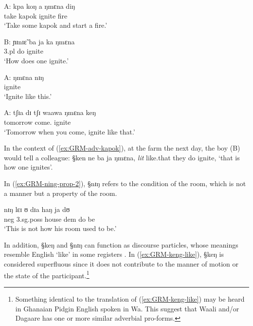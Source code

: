 \begin{exe}
\ex\label{ex:GRM-adv-kapok}
 \begin{xlist}
 
 \ex\label{ex:GRM-adv-kapok-A-1}
\gll A: kpa koŋ a ŋmɛna diŋ\\
{}  take kapok {\conn} ignite fire\\
\glt `Take some kapok and start a fire.'

 \ex\label{ex:GRM-adv-kapok-B}
\gll B:  ɲɪnɪɛ̃ ba ja ka ŋmɛna\\
{} {\q} {\sc 3.pl} do {\egr} ignite\\
\glt `How does one ignite.' 

 \ex\label{ex:GRM-adv-kapok-A-2}
\gll  A: ŋmɛna nɪŋ\\
{} ignite {\advm}\\
\glt `Ignite like this.'

 \ex\label{ex:GRM-adv-kapok-A-3}
 \gll  A: tʃɪa dɪ tʃɪ waawa ŋmɛna keŋ\\
{} tomorrow {\conn} {\cras} come.{\pfv} ignite {\advm}\\
\glt `Tomorrow when you come, ignite like that.'
 \end{xlist}
\end{exe}  
 
In the context of (\ref{ex:GRM-adv-kapok}), at the farm the next day, the boy
(B) would tell a colleague: {\S ken ne ba ja ŋmɛna},  {\it lit} like.that they
do ignite, `that is how one ignites'. 

In (\ref{ex:GRM-ning-prop-2}), {\S nɪŋ} refers to the condition of  the room,
which is not a manner  but a property of the room. 


\begin{exe}
\ex\label{ex:GRM-ning-prop-2}
 \gll nɪŋ lɛɪ ʊ dɪa haŋ ja dʊ\\
 {\advm} {\sc neg}  {\sc 3.sg.poss} house {\sc dem} do be\\
\glt  `This is not how his room used to be.'

\end{exe}

In addition, {\S keŋ} and {\S nɪŋ} can function as  discourse particles, whose
meanings resemble   English `like' in some registers \citep{Muff02}. In
(\ref{ex:GRM-keng-like}), {\S keŋ} is considered superfluous since it does not
contribute to the manner of  motion or the state of the
participant.\footnote{Something identical to the translation of
(\ref{ex:GRM-keng-like}) may be heard in  Ghanaian Pidgin English spoken in Wa.
This suggest that Waali and/or Dagaare has one or more similar adverbial
pro-forms.} 

